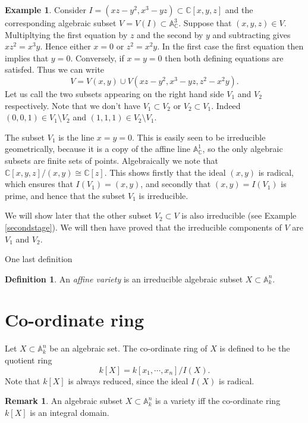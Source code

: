 \documentclass [12pt,oneside,a4paper,mathscr]{amsart}
\theoremstyle{definition}
\newtheorem{defn}[thm]{Definition}
\newtheorem{remark}[thm]{Remark}
\newtheorem{example}[thm]{Example}
\newcommand {\A}{\mathbb A}
\newcommand {\C}{\mathbb C}
\newcommand{\isom}{\cong}
\begin{document}
\begin{example}
\label{twostages}
Consider $I=(xz-y^2,x^3-yz)\subset \C[x,y,z]$ and the corresponding algebraic subset $V=V(I)\subset \A^3_\C$. Suppose that $(x,y,z)\in V$. Multipltying the first equation by $z$ and the second by $y$ and subtracting gives $xz^2=x^3y$. Hence either $x=0$ or $z^2=x^2y$. In the first case the first equation then implies that $y=0$. Conversely, if $x=y=0$ then both defining equations are satisfed. Thus we can write
\[V=V(x,y) \cup V(xz-y^2,x^3-yz,z^2-x^2y).\]
Let us call the two subsets appearing on the right hand side $V_1$ and $V_2$ respectively. Note that we don't have $V_1\subset V_2$ or $V_2\subset V_1$. Indeed $(0,0,1)\in V_1\setminus V_2$ and $(1,1,1)\in V_2\setminus V_1$.

 The subset $V_1$ is the line $x=y=0$. This is easily seen to be irreducible geometrically, because it is a copy of the affine line $\A^1_\C$,  so the only algebraic subsets are finite sets of points. Algebraically we note that $\C[x,y,z]/(x,y)\isom \C[z]$. This shows firstly that the ideal $(x,y)$ is radical, which ensures that $I(V_1)=(x,y)$, and secondly  that $(x,y)=I(V_1)$ is prime,  and hence that the subset $V_1$ is irreducible.

We will show later that the other subset  $V_2\subset V$ is also irreducible (see Example \ref{secondstage}). We will then have proved that the irreducible components of $V$ are $V_1$ and $V_2$.
\end{example}

One last definition

\begin{defn}
An \emph{affine variety} is an irreducible algebraic subset $X\subset \A^n_k$.
\end{defn}



\section{Co-ordinate ring}

Let $X\subset \A^n_k$ be an algebraic set. The co-ordinate ring of $X$ is defined to be the quotient ring
\[k[X]=k[x_1,\cdots,x_n]/I(X).\]
Note that $k[X]$ is always reduced, since the ideal $I(X)$ is radical.

\begin{remark}
An algebraic subset $X\subset \A^n_k$  is a variety iff the co-ordinate ring $k[X]$ is an integral domain.
\end{remark}
\end{document}

